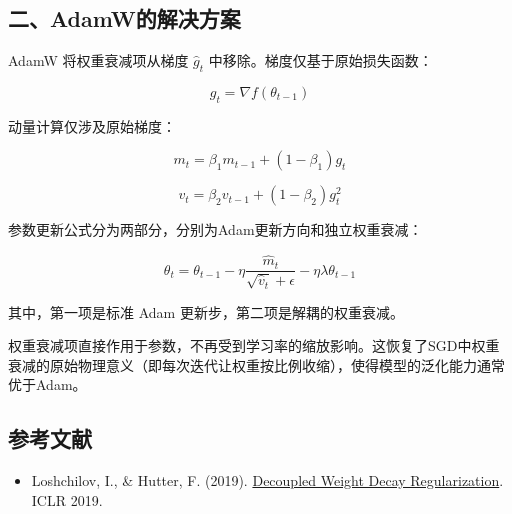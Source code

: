\hypertarget{ux4e8cadamwux7684ux89e3ux51b3ux65b9ux6848}{%
\subsection{二、AdamW的解决方案}\label{ux4e8cadamwux7684ux89e3ux51b3ux65b9ux6848}}

AdamW 将权重衰减项从梯度 \(\hat{g}_t\) 中移除。梯度仅基于原始损失函数：

\[
g_t = \nabla f(\theta_{t-1})
\]

动量计算仅涉及原始梯度：

\[
m_t = \beta_1m_{t-1} + (1-\beta_1)g_t
\]

\[
v_t = \beta_2v_{t-1} + (1-\beta_2)g_t^2
\]

参数更新公式分为两部分，分别为Adam更新方向和独立权重衰减：

\[
\theta_t = \theta_{t-1} - \eta\frac{\hat{m}_t}{\sqrt{\hat{v}_t}+\epsilon} - \eta\lambda\theta_{t-1}
\]

其中，第一项是标准 Adam 更新步，第二项是解耦的权重衰减。

权重衰减项直接作用于参数，不再受到学习率的缩放影响。这恢复了SGD中权重衰减的原始物理意义（即每次迭代让权重按比例收缩），使得模型的泛化能力通常优于Adam。

\FloatBarrier
{}
\hypertarget{ux53c2ux8003ux6587ux732e-29}{%
\subsection{参考文献}\label{ux53c2ux8003ux6587ux732e-29}}

\vspace{0.25em}
\begin{itemize}
\tightlist
\item
  Loshchilov, I., \& Hutter, F. (2019). \href{https://arxiv.org/abs/1711.05101}{Decoupled Weight Decay Regularization}. ICLR 2019.
\end{itemize}

\clearpage
